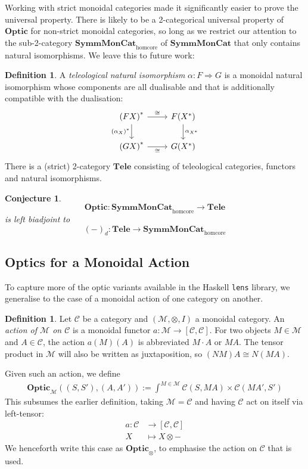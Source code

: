 \documentclass[11pt,letterpaper]{article}
\theoremstyle{plain}
\newtheorem{conjecture}[theorem]{Conjecture}
\theoremstyle{definition}
\newtheorem{definition}[theorem]{Definition}
\newcommand{\C}{\mathscr{C}}
\newcommand{\M}{\mathscr{M}}
\newcommand{\lenslib}{\texttt{lens}}
\newcommand{\SymmMonCat}{\mathbf{SymmMonCat}}
\newcommand{\Tele}{\mathbf{Tele}}
\newcommand{\Optic}{\mathbf{Optic}}
\newcommand{\act}{\cdot}
\begin{document}
Working with strict monoidal categories made it significantly easier to prove the universal property. There is likely to be a 2-categorical universal property of $\Optic$ for non-strict monoidal categories, so long as we restrict our attention to the sub-2-category $\SymmMonCat_\mathrm{homcore}$ of $\SymmMonCat$ that only contains natural isomorphisms. We leave this to future work:

\begin{definition}
  A \emph{teleological natural isomorphism} $\alpha : F \Rightarrow G$ is a monoidal natural isomorphism whose components are all dualisable and that is additionally compatible with the dualisation:
  \[
  \begin{tikzcd}
    {(FX)}^* \ar[r, "\cong"]  \ar[d, "(\alpha_X)^*", swap] & F(X^*) \ar[d, "\alpha_{X^*}"] \\
    {(GX)}^* \ar[r, "\cong", swap] & G(X^*)
  \end{tikzcd}
  \]
  There is a (strict) 2-category $\Tele$ consisting of teleological categories, functors and natural isomorphisms.
\end{definition}

\begin{conjecture}
\[ \Optic : \SymmMonCat_\mathrm{homcore} \to \Tele \] is left biadjoint to \[(-)_d : \Tele \to \SymmMonCat_\mathrm{homcore}\]
\end{conjecture}


\subsection{Optics for a Monoidal Action}

To capture more of the optic variants available in the Haskell \lenslib{} library, we generalise to the case of a monoidal action of one category on another.

\begin{definition}
  Let $\C$ be a category and $(\M, \otimes, I)$ a monoidal category. An \emph{action of $\M$ on $\C$} is a monoidal functor $a : \M \to [\C, \C]$. For two objects $M \in \M$ and $A \in \C$, the action $a(M)(A)$ is abbreviated $M \act A$ or $MA$. The tensor product in $\M$ will also be written as juxtaposition, so $(NM)A \cong N(MA)$.%
\end{definition}

Given such an action, we define
\begin{align*}
  \Optic_\M((S, S'), (A, A')) := \int^{M \in \M} \C(S, MA) \times \C(MA', S')
\end{align*}
This subsumes the earlier definition, taking $\M = \C$ and having $\C$ act on itself via left-tensor:
\begin{align*}
a : \C &\to [\C, \C] \\
X &\mapsto X \otimes -
\end{align*}
We henceforth write this case as $\Optic_\otimes$, to emphasise the action on $\C$ that is used.
\end{document}
